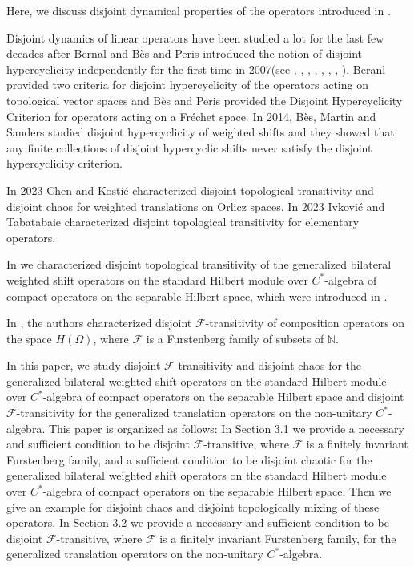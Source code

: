 \documentclass{article}
\begin{document}
Here, we discuss disjoint dynamical properties of the operators introduced in \cite{I24}.

Disjoint dynamics of linear operators have been studied a lot for the last few decades after Bernal \cite{B07} and B\`{e}s and Peris \cite{BP07} introduced the notion of disjoint hypercyclicity independently for the first time in 2007(see \cite{B07}, \cite{BMS14}, \cite{BP07}, \cite{CK23}, \cite{CKP18}, \cite{COT20}, \cite{IT23dis}, \cite{KBA22}).
Beranl \cite{B07} provided two criteria for disjoint hypercyclicity of the operators acting on topological vector spaces and B\`{e}s and Peris \cite{BP07} provided the Disjoint Hypercyclicity Criterion for operators acting on a Fr\'{e}chet space.
In 2014, B\`{e}s, Martin and Sanders \cite{BMS14} studied disjoint hypercyclicity of weighted shifts and they showed that any finite collections of disjoint hypercyclic shifts never satisfy the disjoint hypercyclicity criterion.

In 2023 Chen and Kosti\'{c} \cite{CK23} characterized disjoint topological transitivity and disjoint chaos for weighted translations on Orlicz spaces.
In 2023 Ivkovi\'{c} and Tabatabaie \cite{IT23dis} characterized disjoint topological transitivity for elementary operators.

In \cite{RJ26} we characterized disjoint topological transitivity of the generalized bilateral weighted shift operators on the standard Hilbert module over $C^{\ast}$-algebra of compact operators on the separable Hilbert space, which were introduced in \cite{I24}.

In \cite{KBA22}, the authors characterized disjoint $\mathcal{F}$-transitivity of composition operators on the space $H(\Omega)$, where $\mathcal{F}$ is a Furstenberg family of subsets of $\mathbb{N}$.

In this paper, we study disjoint $\mathcal{F}$-transitivity and disjoint chaos for the generalized bilateral weighted shift operators on the standard Hilbert module over $C^{\ast}$-algebra of compact operators on the separable Hilbert space and disjoint $\mathcal{F}$-transitivity for the generalized translation operators on the non-unitary $C^{\ast}$-algebra. 
This paper is organized as follows:
In Section 3.1 we provide a necessary and sufficient condition to be disjoint $\mathcal{F}$-transitive, where $\mathcal{F}$ is a finitely invariant Furstenberg family, and a sufficient condition to be disjoint chaotic for the generalized bilateral weighted shift operators on the standard Hilbert module over $C^{\ast}$-algebra of compact operators on the separable Hilbert space. Then we give an example for disjoint chaos and disjoint topologically mixing of these operators.
In Section 3.2 we provide a necessary and sufficient condition to be disjoint $\mathcal{F}$-transitive, where $\mathcal{F}$ is a finitely invariant Furstenberg family, for the generalized translation operators on the non-unitary $C^{\ast}$-algebra.
\end{document}
